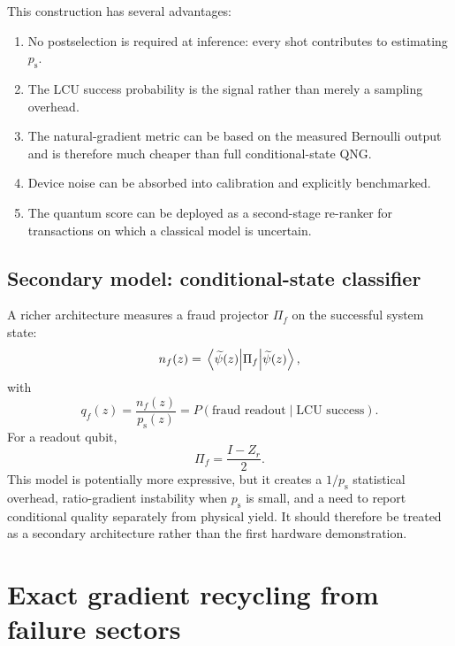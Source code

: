 \documentclass[11pt,a4paper]{article}
\newcommand{\psucc}{p_{\mathrm{s}}}
\begin{document}
This construction has several advantages:
\begin{enumerate}[leftmargin=*]
\item No postselection is required at inference: every shot contributes to estimating $\psucc$.
\item The LCU success probability is the signal rather than merely a sampling overhead.
\item The natural-gradient metric can be based on the measured Bernoulli output and is therefore much cheaper than full conditional-state QNG.
\item Device noise can be absorbed into calibration and explicitly benchmarked.
\item The quantum score can be deployed as a second-stage re-ranker for transactions on which a classical model is uncertain.
\end{enumerate}

\subsection{Secondary model: conditional-state classifier}

A richer architecture measures a fraud projector $\Pi_f$ on the successful system state:
\begin{equation}
    n_f(z)=\mel{\widetilde\psi(z)}{\Pi_f}{\widetilde\psi(z)},
\end{equation}
with
\begin{equation}
    q_f(z)=\frac{n_f(z)}{\psucc(z)}
    =P(\text{fraud readout}\mid\text{LCU success}).
\end{equation}
For a readout qubit,
\begin{equation}
    \Pi_f=\frac{I-Z_r}{2}.
\end{equation}
This model is potentially more expressive, but it creates a $1/\psucc$ statistical overhead, ratio-gradient instability when $\psucc$ is small, and a need to report conditional quality separately from physical yield. It should therefore be treated as a secondary architecture rather than the first hardware demonstration.

\section{Exact gradient recycling from failure sectors}
\end{document}
